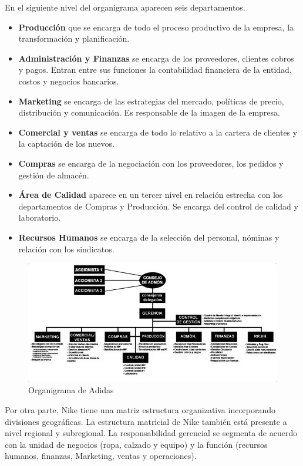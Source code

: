 \documentclass[a4paper,12pt]{article}
\begin{document}
En el siguiente nivel del organigrama aparecen seis departamentos.

\begin{itemize}
	\item \textbf{Producción} que se encarga de todo el proceso productivo de la empresa, la transformación y planificación.

\item \textbf{Administración y Finanzas} se encarga de los proveedores, clientes cobros y pagos. Entran entre sus funciones la contabilidad financiera de la entidad, costos y negocios bancarios.
\item \textbf{Marketing} se encarga de las estrategias del mercado, políticas de precio, distribución y comunicación. Es responsable de la imagen de la empresa.
\item \textbf{Comercial y ventas} se encarga de todo lo relativo a la cartera de clientes y la captación de los nuevos.
\item \textbf{Compras} se encarga de la negociación con los proveedores, los pedidos y gestión de almacén.
\item \textbf{Área de Calidad} aparece en un tercer nivel en relación estrecha con los departamentos de Compras y Producción. Se encarga del control de calidad y laboratorio.
\item \textbf{Recursos Humanos} se encarga de la selección del personal, nóminas y relación con los sindicatos.
\end{itemize}

\begin{figure}[ht!]
	\centering

	\includegraphics[width=.9\textwidth]{adi}

	\caption{Organigrama de Adidas}
\end{figure}


\clearpage
Por otra parte, Nike tiene una matriz estructura organizativa incorporando divisiones geográficas. La estructura matricial de Nike también está presente a nivel regional y subregional. La responsabilidad gerencial se segmenta de acuerdo con la unidad de negocios (ropa, calzado y equipo) y la función (recursos humanos, finanzas, Marketing, ventas y operaciones).
\end{document}
